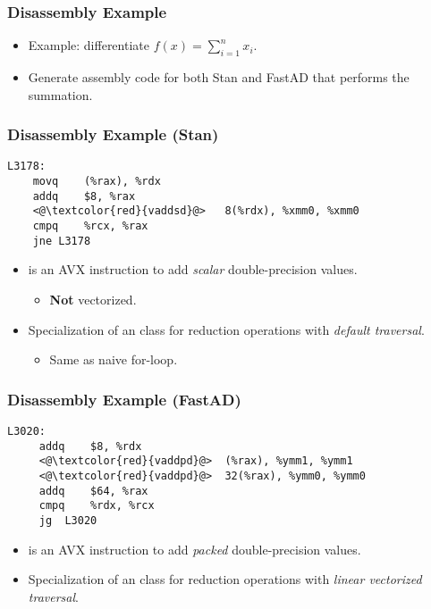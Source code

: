 \begin{frame}
\frametitle{Disassembly Example}

\begin{itemize}

\item Example: differentiate $f(x) = \sum\limits_{i=1}^n x_i$.

\item Generate assembly code for both Stan and FastAD that performs the summation.

\end{itemize}
\end{frame}

\begin{frame}[fragile]
\frametitle{Disassembly Example (Stan)}

\begin{lstlisting}[style=customasm]
L3178:
    movq    (%rax), %rdx
    addq    $8, %rax
    <@\textcolor{red}{vaddsd}@>   8(%rdx), %xmm0, %xmm0 
    cmpq    %rcx, %rax 
    jne L3178
\end{lstlisting}

\begin{itemize}
\item {} is an AVX instruction to add \emph{scalar} double-precision values.
    \begin{itemize}
        \item \textbf{Not} vectorized.
    \end{itemize}

\item Specialization of an  class 
    for reduction operations with \emph{default traversal}.
    \begin{itemize}
        \item Same as naive for-loop.
    \end{itemize}

\end{itemize}
\end{frame}

\begin{frame}[fragile]
\frametitle{Disassembly Example (FastAD)}

\begin{lstlisting}[style=customasm]
 L3020:
     addq    $8, %rdx
     <@\textcolor{red}{vaddpd}@>  (%rax), %ymm1, %ymm1   
     <@\textcolor{red}{vaddpd}@>  32(%rax), %ymm0, %ymm0 
     addq    $64, %rax
     cmpq    %rdx, %rcx 
     jg  L3020 
\end{lstlisting}

\begin{itemize}

\item {} is an AVX instruction to add \emph{packed} double-precision values.

\item Specialization of an  class 
    for reduction operations with \emph{linear vectorized traversal}.

\end{itemize}
\end{frame}

